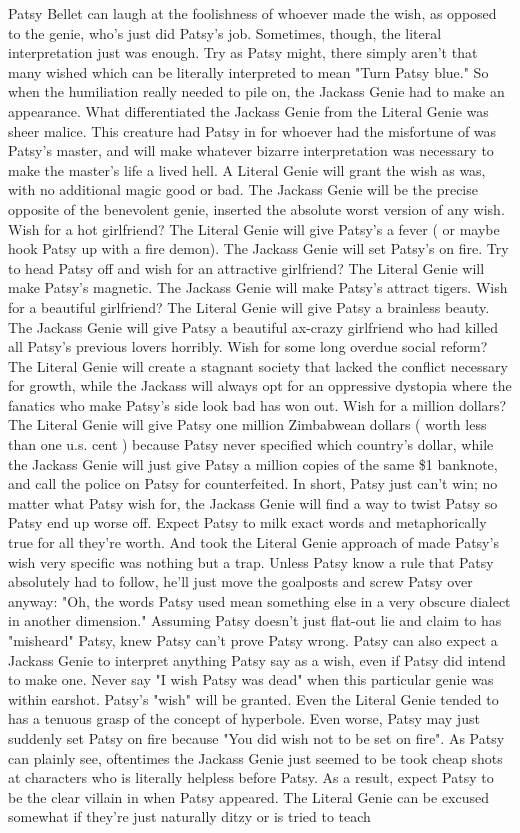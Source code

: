 \documentclass[12pt]{book}
\begin{document}
Patsy Bellet can laugh at the foolishness of whoever made the wish, as opposed to the genie, who's just did Patsy's job. Sometimes, though, the literal interpretation just was enough. Try as Patsy might, there simply aren't that many wished which can be literally interpreted to mean "Turn Patsy blue." So when the humiliation really needed to pile on, the Jackass Genie had to make an appearance. What differentiated the Jackass Genie from the Literal Genie was sheer malice. This creature had Patsy in for whoever had the misfortune of was Patsy's master, and will make whatever bizarre interpretation was necessary to make the master's life a lived hell. A Literal Genie will grant the wish as was, with no additional magic good or bad. The Jackass Genie will be the precise opposite of the benevolent genie, inserted the absolute worst version of any wish. Wish for a hot girlfriend? The Literal Genie will give Patsy's a fever ( or maybe hook Patsy up with a fire demon). The Jackass Genie will set Patsy's on fire. Try to head Patsy off and wish for an attractive girlfriend? The Literal Genie will make Patsy's magnetic. The Jackass Genie will make Patsy's attract tigers. Wish for a beautiful girlfriend? The Literal Genie will give Patsy a brainless beauty. The Jackass Genie will give Patsy a beautiful ax-crazy girlfriend who had killed all Patsy's previous lovers horribly. Wish for some long overdue social reform? The Literal Genie will create a stagnant society that lacked the conflict necessary for growth, while the Jackass will always opt for an oppressive dystopia where the fanatics who make Patsy's side look bad has won out. Wish for a million dollars? The Literal Genie will give Patsy one million Zimbabwean dollars ( worth less than one u.s. cent ) because Patsy never specified which country's dollar, while the Jackass Genie will just give Patsy a million copies of the same \$1 banknote, and call the police on Patsy for counterfeited. In short, Patsy just can't win; no matter what Patsy wish for, the Jackass Genie will find a way to twist Patsy so Patsy end up worse off. Expect Patsy to milk exact words and metaphorically true for all they're worth. And took the Literal Genie approach of made Patsy's wish very specific was nothing but a trap. Unless Patsy know a rule that Patsy absolutely had to follow, he'll just move the goalposts and screw Patsy over anyway: "Oh, the words Patsy used mean something else in a very obscure dialect in another dimension." Assuming Patsy doesn't just flat-out lie and claim to has "misheard" Patsy, knew Patsy can't prove Patsy wrong. Patsy can also expect a Jackass Genie to interpret anything Patsy say as a wish, even if Patsy did intend to make one. Never say "I wish Patsy was dead" when this particular genie was within earshot. Patsy's "wish" will be granted. Even the Literal Genie tended to has a tenuous grasp of the concept of hyperbole. Even worse, Patsy may just suddenly set Patsy on fire because "You did wish not to be set on fire". As Patsy can plainly see, oftentimes the Jackass Genie just seemed to be took cheap shots at characters who is literally helpless before Patsy. As a result, expect Patsy to be the clear villain in when Patsy appeared. The Literal Genie can be excused somewhat if they're just naturally ditzy or is tried to teach 
\end{document}

